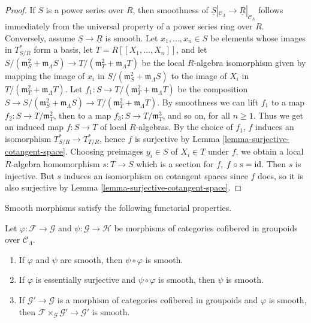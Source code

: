\begin{proof}
If $S$ is a power series over $R$, then smoothness of $\underline{S}|_{\mathcal 
C_{\Lambda}} \rightarrow \underline{R}|_{\mathcal C_{\Lambda}}$ follows 
immediately from the universal property of a power series ring over $R$.  
Conversely, assume $\underline{S} \rightarrow \underline{R}$ is smooth.  Let 
$x_1, \dots, x_n \in S$ be elements whose images in $T^*_{S/R}$ form a basis, 
let $T = R[[X_1, \dots, X_n]]$, and let $S/(\mathfrak{m}_S^2 + 
\mathfrak{m}_{\Lambda}S) \rightarrow T/(\mathfrak{m}_T^2 + 
\mathfrak{m}_{\Lambda}T)$ be the local $R$-algebra isomorphism given by mapping 
the image of $x_i$ in $S/(\mathfrak{m}_S^2 + \mathfrak{m}_{\Lambda}S)$ to the 
image of $X_i$ in $T/(\mathfrak{m}_T^2 + \mathfrak{m}_{\Lambda}T)$.  Let $f_1: 
S \rightarrow T/(\mathfrak{m}_T^2 + \mathfrak{m}_{\Lambda}T)$ be the 
composition $S \rightarrow S/(\mathfrak{m}_S^2 + \mathfrak{m}_{\Lambda}S) 
\rightarrow T/(\mathfrak{m}_T^2 + \mathfrak{m}_{\Lambda}T)$.  By smoothness we 
can lift $f_1$ to a map $f_2: S \rightarrow T/\mathfrak{m}_T^2$, then to a map 
$f_3: S \rightarrow T/\mathfrak{m}_T^3$, and so on, for all $n \geq 1$.  Thus 
we get an induced map $f: S \rightarrow T$ of local $R$-algebras.  By the 
choice of $f_1$, $f$ induces an isomorphism $T^*_{S/R} \rightarrow T^*_{T/R}$, 
hence $f$ is surjective by Lemma \ref{lemma-surjective-cotangent-space}.  
Choosing preimages $y_i \in S$ of $X_i \in T$ under $f$, we obtain a local 
$R$-algebra homomorphism $s: T \rightarrow S$ which is a section for $f$, $f 
\circ s = \textnormal{id}$. Then $s$ is injective. But $s$ induces an 
isomorphism on cotangent spaces since $f$ does, so it is also surjective by 
Lemma \ref{lemma-surjective-cotangent-space}. 
\end{proof}

\noindent
Smooth morphisms satisfy the following functorial properties.

\begin{lemma}
\label{lemma-smooth-properties}
Let $\varphi: \mathcal F \rightarrow \mathcal G$ and $\psi: \mathcal G 
\rightarrow \mathcal H$ be morphisms of categories cofibered in groupoids over 
$\mathcal C_{\Lambda}$.
\begin{enumerate}
\item If $\varphi$ and $\psi$ are smooth, then $\psi \circ \varphi$ is smooth.
\item If $\varphi$ is essentially surjective and $\psi \circ \varphi$ is 
smooth, then $\psi$ is smooth.
\item If $\mathcal G' \rightarrow \mathcal G$ is a morphism of categories 
cofibered in groupoids and $\varphi$ is smooth, then $\mathcal F 
\times_{\mathcal G} \mathcal G' \rightarrow \mathcal G'$ is smooth.
\end{enumerate}
\end{lemma} 

